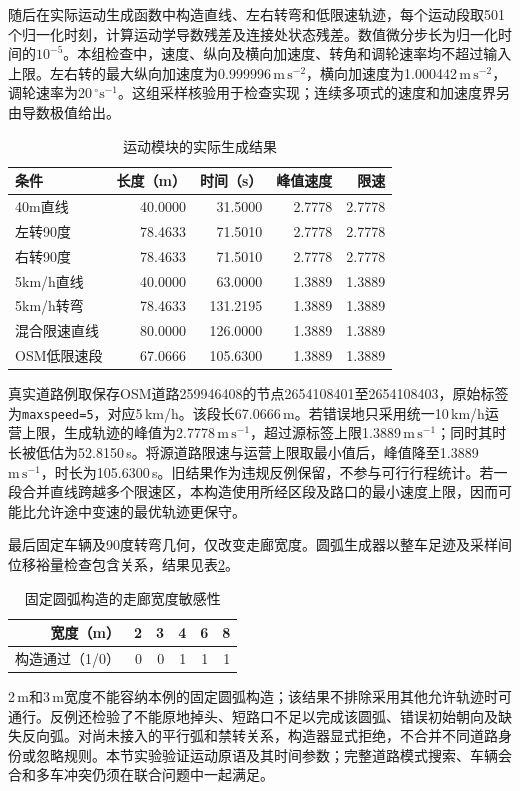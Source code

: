 随后在实际运动生成函数中构造直线、左右转弯和低限速轨迹，每个运动段取501个归一化时刻，计算运动学导数残差及连接处状态残差。数值微分步长为归一化时间的$10^{-5}$。本组检查中，速度、纵向及横向加速度、转角和调轮速率均不超过输入上限。左右转的最大纵向加速度为0.999996\,$\mathrm{m\,s^{-2}}$，横向加速度为1.000442\,$\mathrm{m\,s^{-2}}$，调轮速率为20\,$^{\circ}\mathrm{s^{-1}}$。这组采样核验用于检查实现；连续多项式的速度和加速度界另由导数极值给出。

\begin{table}[htbp]
\centering\small
\caption{运动模块的实际生成结果}
\label{s0407:motion_results}
\begin{tabular}{@{}lrrrr@{}}
\toprule
条件 & 长度（m） & 时间（s） & 峰值速度 & 限速\\
\midrule
40m直线 & 40.0000 & 31.5000 & 2.7778 & 2.7778\\
左转90度 & 78.4633 & 71.5010 & 2.7778 & 2.7778\\
右转90度 & 78.4633 & 71.5010 & 2.7778 & 2.7778\\
5km/h直线 & 40.0000 & 63.0000 & 1.3889 & 1.3889\\
5km/h转弯 & 78.4633 & 131.2195 & 1.3889 & 1.3889\\
混合限速直线 & 80.0000 & 126.0000 & 1.3889 & 1.3889\\
OSM低限速段 & 67.0666 & 105.6300 & 1.3889 & 1.3889\\
\bottomrule
\end{tabular}
\par{}
\end{table}

真实道路例取保存OSM道路259946408的节点2654108401至2654108403，原始标签为\texttt{maxspeed=5}，对应5\,km/h\cite{OSMData}。该段长67.0666\,m。若错误地只采用统一10\,km/h运营上限，生成轨迹的峰值为2.7778\,$\mathrm{m\,s^{-1}}$，超过源标签上限1.3889\,$\mathrm{m\,s^{-1}}$；同时其时长被低估为52.8150\,s。将源道路限速与运营上限取最小值后，峰值降至1.3889\,$\mathrm{m\,s^{-1}}$，时长为105.6300\,s。旧结果作为违规反例保留，不参与可行行程统计。若一段合并直线跨越多个限速区，本构造使用所经区段及路口的最小速度上限，因而可能比允许途中变速的最优轨迹更保守。

最后固定车辆及90度转弯几何，仅改变走廊宽度。圆弧生成器以整车足迹及采样间位移裕量检查包含关系，结果见表\ref{s0407:width_sensitivity}。
\begin{table}[htbp]
\centering\small
\caption{固定圆弧构造的走廊宽度敏感性}
\label{s0407:width_sensitivity}
\begin{tabular}{@{}rrrrrr@{}}
\toprule
宽度（m） & 2 & 3 & 4 & 6 & 8\\
\midrule
构造通过（1/0） & 0 & 0 & 1 & 1 & 1\\
\bottomrule
\end{tabular}
\end{table}

2\,m和3\,m宽度不能容纳本例的固定圆弧构造；该结果不排除采用其他允许轨迹时可通行。反例还检验了不能原地掉头、短路口不足以完成该圆弧、错误初始朝向及缺失反向弧。对尚未接入的平行弧和禁转关系，构造器显式拒绝，不合并不同道路身份或忽略规则。本节实验验证运动原语及其时间参数；完整道路模式搜索、车辆会合和多车冲突仍须在联合问题中一起满足。
